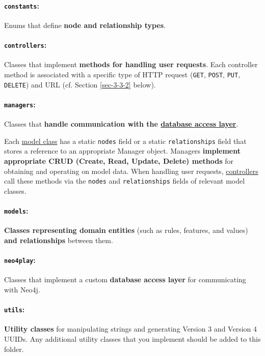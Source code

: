 \documentclass[11pt]{article}
\begin{document}
\paragraph{\texttt{constants}:}
\label{sec-3-3-1-1}
Enums that define \textbf{node and relationship types}.

\paragraph{\texttt{controllers}:}
\label{sec-3-3-1-2}
Classes that implement \textbf{methods for handling user requests}. Each
controller method is associated with a specific type of HTTP
request (\texttt{GET}, \texttt{POST}, \texttt{PUT}, \texttt{DELETE}) and URL (cf. Section
\ref{sec-3-3-2} below).

\paragraph{\texttt{managers}:}
\label{sec-3-3-1-3}
Classes that \textbf{handle communication with the \hyperref[sec-3-3-1-5]{database access layer}}.

Each \hyperref[sec-3-3-1-4]{model class} has a static \texttt{nodes} field or a static
\texttt{relationships} field that stores a reference to an appropriate
Manager object. Managers \textbf{implement appropriate CRUD (Create,
Read, Update, Delete) methods} for obtaining and operating on
model data. When handling user requests, \hyperref[sec-3-3-1-2]{controllers} call these
methods via the \texttt{nodes} and \texttt{relationships} fields of relevant
model classes.

\paragraph{\texttt{models}:}
\label{sec-3-3-1-4}
\textbf{Classes representing domain entities} (such as rules, features,
and values) \textbf{and relationships} between them.

\paragraph{\texttt{neo4play}:}
\label{sec-3-3-1-5}
Classes that implement a custom \textbf{database access layer} for
communicating with Neo4j.

\paragraph{\texttt{utils}:}
\label{sec-3-3-1-6}
\textbf{Utility classes} for manipulating strings and generating Version
3 and Version 4 UUIDs. Any additional utility classes that you
implement should be added to this folder.
\end{document}
